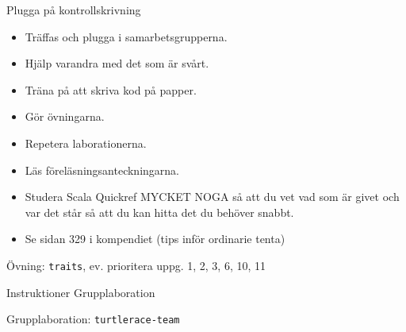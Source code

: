 \begin{Slide}{Plugga på kontrollskrivning}
\begin{itemize}
\item Träffas och plugga i samarbetsgrupperna.
\item Hjälp varandra med det som är svårt.
\item Träna på att skriva kod på papper.
\item Gör övningarna.
\item Repetera laborationerna.
\item Läs föreläsningsanteckningarna.
\item Studera Scala Quickref MYCKET NOGA så att du vet vad som är givet och var det står så att du kan hitta det du behöver snabbt.
\item Se sidan 329 i kompendiet (tips inför ordinarie tenta)
\end{itemize}
\end{Slide}









\begin{Slide}{Övning: \texttt{traits}, ev. prioritera uppg. 1, 2, 3, 6, 10, 11}
\begin{itemize}\SlideFontTiny

\end{itemize}
\end{Slide}

\begin{Slide}{Instruktioner Grupplaboration}
\begin{itemize}\SlideFontSmall

\end{itemize}
\end{Slide}

\begin{Slide}{Grupplaboration: \texttt{turtlerace-team}}
\begin{itemize}

\end{itemize}
\end{Slide}



\fi

